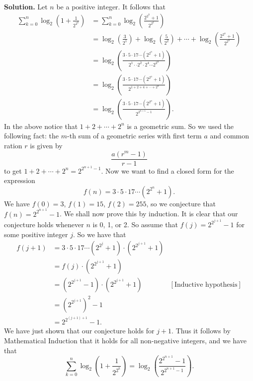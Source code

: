 \documentclass[9pt]{article}
\begin{document}
\begin{enumerate}
      \textbf{Solution.} Let $n$ be a positive integer. It follows that
      \begin{align*}
         \sum_{k=0}^n\log_2\left(1 + \frac{1}{2^{2^k}}\right) &=
            \sum_{k=0}^n\log_2\left(\frac{2^{2^k}+1}{2^{2^k}}\right) \\
            &= \log_2\left(\frac{3}{2^1}\right) +
               \log_2\left(\frac{5}{2^2}\right) + \cdots +
               \log_2\left(\frac{2^{2^n}+1}{2^{2^n}}\right) \\
            &= \log_2\left(\frac{3\cdot5\cdot17\cdots(2^{2^n}+1)}
                  {2^1\cdot\cdot2^2\cdot2^4\cdots2^{2^n}}\right) \\
            &= \log_2\left(\frac{3\cdot5\cdot17\cdots(2^{2^n}+1)}
                  {2^{1+2+4+\cdots+2^n}}\right) \\
            &= \log_2\left(\frac{3\cdot5\cdot17\cdots(2^{2^n}+1)}
                  {2^{2^{n+1}-1}}\right).
      \end{align*}
      In the above notice that $1 + 2 + \cdots + 2^n$ is a geometric sum. So we
      used the following fact: the $m$-th sum of a geometric series with first
      term $a$ and common ration $r$ is given by
      $$\frac{a(r^m - 1)}{r - 1}$$
      to get $1 + 2 + \cdots + 2^n = 2^{2^{n+1}-1}$. Now we want to find a
      closed form for the expression
      $$f(n) = 3\cdot5\cdot17\cdots(2^{2^n}+1).$$
      We have $f(0) = 3$, $f(1) = 15$, $f(2) = 255$, so we conjecture that
      $f(n) = 2^{2^{n+1}} - 1$. We shall now prove this by induction. It is
      clear that our conjecture holds whenever $n$ is 0, 1, or 2. So assume that
      $f(j) = 2^{2^{j+1}} - 1$ for some positive integer $j$. So we have that
      \begin{align*}
         f(j+1) &= 3\cdot5\cdot17\cdots(2^{2^j}+1)\cdot(2^{2^{j+1}}+1) \\
            &= f(j) \cdot (2^{2^{j+1}}+1) \\
            &= (2^{2^{j+1}} - 1)\cdot (2^{2^{j+1}}+1)
               &[\text{Inductive hypothesis}] \\
            &= (2^{2^{j+1}})^2 - 1\\
            &= 2^{2^{(j+1)+1}} - 1.
      \end{align*}
      We have just shown that our conjecture holds for $j + 1$. Thus it follows
      by Mathematical Induction that it holds for all non-negative integers, and
      we have that
      $$\sum_{k=0}^n\log_2\left(1 + \frac{1}{2^{2^k}}\right) =
           \log_2\left(\frac{2^{2^{n+1}} - 1}{2^{2^{n+1}-1}}\right).$$
           

\end{enumerate}
\end{document}
